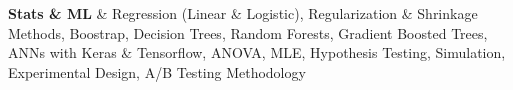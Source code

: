 \textbf{Stats \& ML} & 
Regression (Linear \& Logistic), 
Regularization \& Shrinkage Methods, 
Boostrap, 
Decision Trees, 
Random Forests, 
Gradient Boosted Trees, 
ANNs with Keras \& Tensorflow,
ANOVA, 
MLE, 
Hypothesis Testing, 
Simulation, 
Experimental Design, 
A/B Testing Methodology